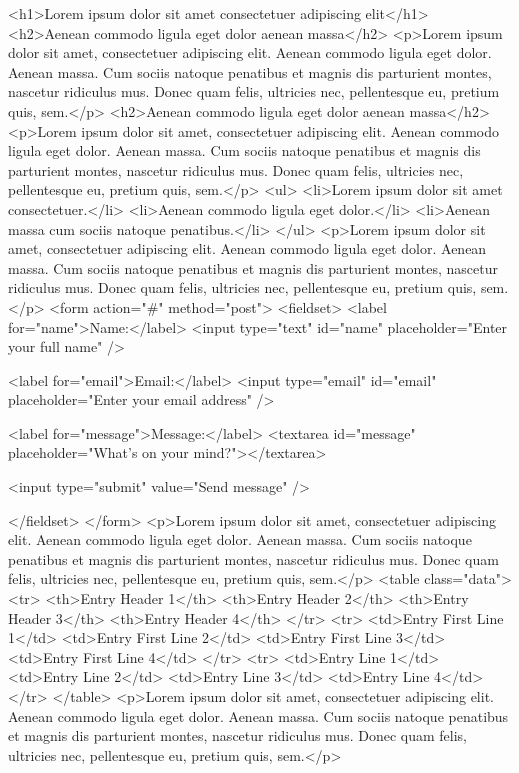 \documentclass{biorxiv}
\begin{document}
\begin{code}
<h1>Lorem ipsum dolor sit amet consectetuer adipiscing
elit</h1>
<h2>Aenean commodo ligula eget dolor aenean massa</h2>
<p>Lorem ipsum dolor sit amet, consectetuer adipiscing
elit. Aenean commodo ligula eget dolor. Aenean massa.
Cum sociis natoque penatibus et magnis dis parturient
montes, nascetur ridiculus mus. Donec quam felis,
ultricies nec, pellentesque eu, pretium quis, sem.</p>
<h2>Aenean commodo ligula eget dolor aenean massa</h2>
<p>Lorem ipsum dolor sit amet, consectetuer adipiscing
elit. Aenean commodo ligula eget dolor. Aenean massa.
Cum sociis natoque penatibus et magnis dis parturient
montes, nascetur ridiculus mus. Donec quam felis,
ultricies nec, pellentesque eu, pretium quis, sem.</p>
<ul>
  <li>Lorem ipsum dolor sit amet consectetuer.</li>
  <li>Aenean commodo ligula eget dolor.</li>
  <li>Aenean massa cum sociis natoque penatibus.</li>
</ul>
<p>Lorem ipsum dolor sit amet, consectetuer adipiscing
elit. Aenean commodo ligula eget dolor. Aenean massa.
Cum sociis natoque penatibus et magnis dis parturient
montes, nascetur ridiculus mus. Donec quam felis,
ultricies nec, pellentesque eu, pretium quis, sem.</p>
<form action="#" method="post">
  <fieldset>
    <label for="name">Name:</label>
    <input type="text" id="name" placeholder="Enter your
full name" />

    <label for="email">Email:</label>
    <input type="email" id="email" placeholder="Enter
your email address" />

    <label for="message">Message:</label>
    <textarea id="message" placeholder="What's on your
mind?"></textarea>

    <input type="submit" value="Send message" />

  </fieldset>
</form>
<p>Lorem ipsum dolor sit amet, consectetuer adipiscing
elit. Aenean commodo ligula eget dolor. Aenean massa.
Cum sociis natoque penatibus et magnis dis parturient
montes, nascetur ridiculus mus. Donec quam felis,
ultricies nec, pellentesque eu, pretium quis, sem.</p>
<table class="data">
  <tr>
    <th>Entry Header 1</th>
    <th>Entry Header 2</th>
    <th>Entry Header 3</th>
    <th>Entry Header 4</th>
  </tr>
  <tr>
    <td>Entry First Line 1</td>
    <td>Entry First Line 2</td>
    <td>Entry First Line 3</td>
    <td>Entry First Line 4</td>
  </tr>
  <tr>
    <td>Entry Line 1</td>
    <td>Entry Line 2</td>
    <td>Entry Line 3</td>
    <td>Entry Line 4</td>
  </tr>
</table>
<p>Lorem ipsum dolor sit amet, consectetuer adipiscing
elit. Aenean commodo ligula eget dolor. Aenean massa.
Cum sociis natoque penatibus et magnis dis parturient
montes, nascetur ridiculus mus. Donec quam felis,
ultricies nec, pellentesque eu, pretium quis, sem.</p>
\end{code}
\end{document}
